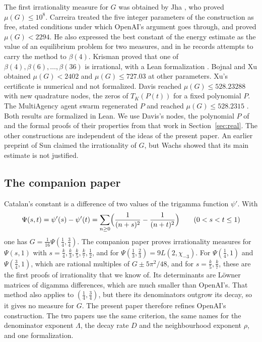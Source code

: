 \documentclass[11pt]{amsart}
\theoremstyle{definition}
\theoremstyle{remark}
\numberwithin{equation}{section}
\begin{document}
The first irrationality measure for $G$ was obtained by Jha \cite{Jha2026}, who proved $\mu(G)\le10^8$.
Carreira \cite{Carreira2026} treated the five integer parameters of the construction as free, stated
conditions under which OpenAI's argument goes through, and proved $\mu(G)<2294$. He also expressed the best
constant of the energy estimate as the value of an equilibrium problem for two measures, and in
\cite{Carreira2026b} he records attempts to carry the method to $\beta(4)$. Krisman proved that one of
$\beta(4),\beta(6),\ldots,\beta(36)$ is irrational, with a Lean formalization \cite{Krisman26}. Bojnal \cite{Bojnal2026} and Xu
\cite{Xu2026} obtained $\mu(G)<2402$ and $\mu(G)\le727.03$ at other parameters. Xu's certificate is
numerical and not formalized. Davis \cite{Davis2026} reached $\mu(G)\le528.23288$ with new quadrature nodes, the zeros of $T_K(P(t))$
for a fixed polynomial $P$. The MultiAgency agent swarm regenerated $P$ and reached $\mu(G)\le528.2315$
\cite{MultiAgency2026}. Both results are formalized in Lean. We use Davis's nodes, the polynomial
$P$ of \cite{Davis2026} and the formal proofs of their properties from that work in
Section~\ref{sec:real}. The other constructions are independent of the ideas of the present paper.
An earlier preprint of Sun \cite{Sun2026} claimed the irrationality of $G$, but Wachs
\cite{Wachs2026} showed that its main estimate is not justified.

\subsection{The companion paper}
Catalan's constant is a difference of two values of the trigamma function $\psi'$. With
\[
 \Psi(s,t)=\psi'(s)-\psi'(t)=\sum_{n\ge0}\Bigl(\frac1{(n+s)^2}-\frac1{(n+t)^2}\Bigr)\qquad(0<s<t\le1)
\]
one has $G=\frac1{16}\Psi(\frac14,\frac34)$. The companion paper \cite{Litsey2026b} proves irrationality
measures for $\Psi(s,1)$ with $s=\frac k4,\frac k3,\frac k5,\frac k7,\frac12$, and for
$\Psi(\frac13,\frac23)=9L(2,\chi_{-3})$. For $\Psi(\frac14,1)$ and $\Psi(\frac34,1)$, which are rational multiples
of $G\pm5\pi^2/48$, and for $s=\frac k5,\frac k7$, these are the first proofs of irrationality that we know of. Its determinants are L\"owner matrices of digamma differences,
which are much smaller than OpenAI's. That method also applies to $(\frac14,\frac34)$, but there its
denominators outgrow its decay, so it gives no measure for $G$. The present paper therefore refines
OpenAI's construction. The two papers use the same criterion, the same names for the denominator exponent
$\Lambda$, the decay rate $D$ and the neighbourhood exponent $\rho$, and one formalization.
\end{document}
